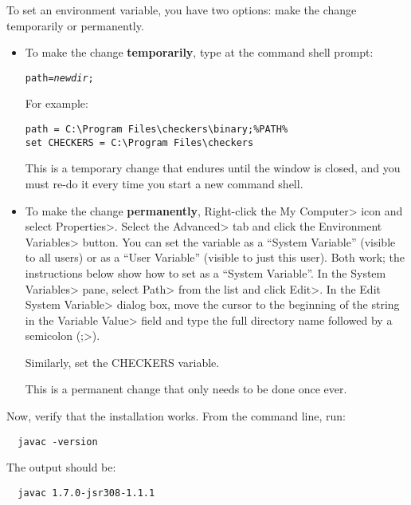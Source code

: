 \begin{enumerate}

To set an environment variable, you have two options:  make the change
temporarily or permanently.
\begin{itemize}
\item
To make the change \textbf{temporarily}, type at the command shell prompt:

\begin{alltt}
path = \emph{newdir};%PATH%
\end{alltt}

For example:

\begin{Verbatim}
path = C:\Program Files\checkers\binary;%PATH%
set CHECKERS = C:\Program Files\checkers
\end{Verbatim}

This is a temporary change that endures until the window is closed, and you
must re-do it every time you start a new command shell.

\item
To make the change \textbf{permanently},
Right-click the \<My Computer> icon and
select \<Properties>. Select the \<Advanced> tab and click the
\<Environment Variables> button. You can set the variable as a ``System
Variable'' (visible to all users) or as a ``User Variable'' (visible to
just this user).  Both work; the instructions below show how to set as a
``System Variable''.
In the \<System Variables> pane, select
\<Path> from the list and click \<Edit>. In the \<Edit System Variable>
dialog box, move the cursor to the beginning of the string in the
\<Variable Value> field and type the full directory name followed by a
semicolon (\<;>).

Similarly, set the CHECKERS variable.

This is a permanent change that only needs to be done once ever.
\end{itemize}



Now, verify that the installation works.  From the command line, run:

\begin{Verbatim}
  javac -version
\end{Verbatim}

The output should be:

\begin{Verbatim}
  javac 1.7.0-jsr308-1.1.1
\end{Verbatim}

\end{enumerate}


